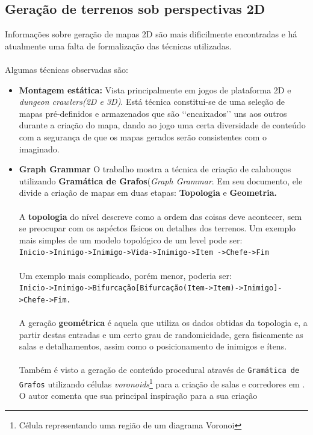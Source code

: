 	\subsection{Geração de terrenos sob perspectivas 2D}
		Informações sobre geração de mapas 2D são mais dificilmente encontradas e há atualmente uma falta de formalização das técnicas utilizadas.
		\\ \\Algumas técnicas observadas são:
		\begin{itemize}
		\item \textbf{Montagem estática:}	
			Vista principalmente em jogos de plataforma 2D e \textit{dungeon crawlers(2D e 3D)}.
			Está técnica constitui-se de uma seleção de mapas pré-definidos e armazenados que são \lq\lq{encaixados}\rq\rq{} uns aos outros 	durante a criação do mapa, dando ao jogo uma certa diversidade de conteúdo com a segurança de que os
			mapas gerados serão consistentes com o imaginado.
		\item \textbf{Graph Grammar}
			O trabalho \cite{automaticDunGen} mostra a técnica de criação de calabouços utilizando \textbf{Gramática de Grafos}(\textit{Graph Grammar}. Em seu documento, ele divide a criação de mapas em duas etapas: \textbf{Topologia} e 
			\textbf{Geometria.}
			\\ \\A \textbf{topologia} do nível descreve como a ordem das coisas deve acontecer, sem se preocupar com os aspéctos 
			físicos ou detalhes dos terrenos. 
			Um exemplo mais simples de um modelo topológico de um level pode ser: 
			\\ \texttt{Inicio->Inimigo->Inimigo->Vida->Inimigo->Item ->Chefe->Fim}
			\\ \\ Um exemplo mais complicado, porém menor, poderia ser:
			\\ \texttt{Inicio->Inimigo->Bifurcação[Bifurcação(Item->Item)->Inimigo]->Chefe->Fim. }
			\\ \\A geração \textbf{geométrica} é aquela que utiliza os dados obtidas da topologia e, a partir destas entradas e
			um certo grau de randomicidade, gera fisicamente as salas e detalhamentos, assim como o posicionamento de inimigos e 	
			ítens.
			\\ \\Também é visto a geração de conteúdo procedural através de \texttt{Gramática de Grafos} utilizando células \textit{voronoids}\footnote{Célula representando uma região de um diagrama Voronoi} para a criação de salas e corredores em \cite{Voronoid}. O autor comenta que sua principal inspiração para a sua criação 	

\end{itemize}
